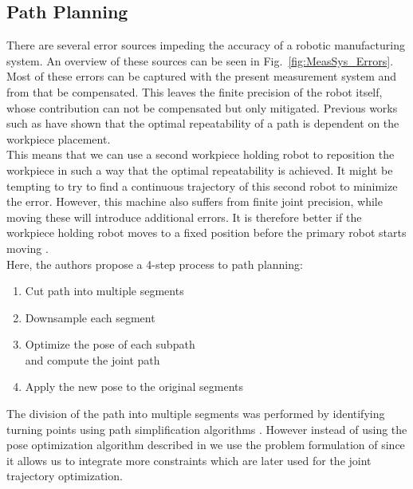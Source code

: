 \documentclass[5p,times,procedia]{elsarticle}
\newcommand{\rem}[1]{\textcolor{red}{\sout{#1}}}
\newcommand{\prop}[1]{\textcolor{blue}{#1}}
\begin{document}
\subsection{Path Planning}\label{subsec:PathPlanning}
There are several error sources impeding the accuracy of a robotic manufacturing system.
An overview of these sources can be seen in Fig.~\ref{fig:MeasSys_Errors}.
Most of these errors can be captured with the present measurement system and from that be compensated.
This leaves the finite precision of the robot itself, whose contribution can not be compensated but only mitigated.
Previous works such as \cite{previous_work} have shown that the optimal repeatability of a path is dependent on the workpiece placement.\\
This means that we can use a second workpiece holding robot to reposition the workpiece in such a way that the optimal repeatability is achieved. It might be tempting to try to find a continuous trajectory of this second robot to minimize the error. However, this machine also suffers from finite joint precision, while moving these will introduce additional errors.
It is therefore better if the workpiece holding robot moves to a fixed position before the primary robot starts moving \prop{\cite{stroke_division}}. %
\prop{\\}
Here, the authors propose a 4-step process to path planning:
\begin{enumerate}
	\setlength\itemsep{-0.5em}
	\item Cut path into multiple segments
	\item Downsample each segment
	\item Optimize the pose of each subpath\\and compute the joint path
	\item Apply the new pose to the original segments
\end{enumerate}
The division of the path into multiple segments was performed by identifying turning points using path simplification algorithms \cite{stroke_division}.
However instead of using the pose optimization algorithm described in \cite{stroke_division} we use the problem formulation of \cite{previous_work} since it allows us to integrate more constraints which are later used for the joint trajectory optimization.
%
\end{document}
